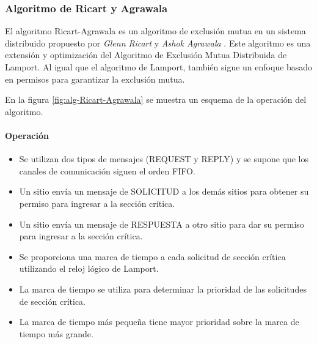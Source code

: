 {%
\subsubsection{	Algoritmo de Ricart y Agrawala}


 
 El algoritmo Ricart-Agrawala es un algoritmo 	de exclusión mutua en un sistema distribuido propuesto 	por \textit{Glenn Ricart} y  \textit{Ashok Agrawala}  . 
 Este algoritmo es una extensión y optimización del Algoritmo de Exclusión 	Mutua Distribuida de Lamport. 
Al igual que el algoritmo de Lamport, también sigue un enfoque basado en permisos para garantizar la exclusión mutua.

En la figura \ref{fig:alg-Ricart-Agrawala} se muestra un esquema de la operaci\'on del algoritmo.
	 
 
\paragraph{Operaci\'on}
	\begin{itemize} 
		\item  Se utilizan dos tipos de mensajes (REQUEST y REPLY) y se supone que los canales de comunicación siguen el
		orden FIFO. 
		\item Un sitio envía un mensaje de SOLICITUD a los
		demás sitios para obtener su permiso para ingresar a la
		sección crítica.
		\item Un sitio envía un mensaje de RESPUESTA a otro sitio para 	dar su permiso para ingresar a la sección crítica.
		\item Se proporciona una marca de tiempo a cada solicitud de 	sección crítica utilizando el reloj lógico de Lamport.
		\item La marca de tiempo se utiliza para determinar la prioridad 	de las solicitudes de sección crítica. 
		\item La marca de tiempo más pequeña tiene mayor prioridad sobre la marca de  tiempo más grande. 
	\end{itemize}
 
}
